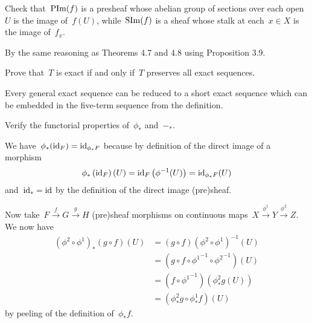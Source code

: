 \documentclass[a4paper,11pt,oneside,openany,article]{memoir}
\begin{document}
\begin{exercise}[6.3]
  Check that~$\operatorname{PIm}(f)$ is a presheaf whose abelian group of sections over each open~$U$ is the image of~$f(U)$, while~$\operatorname{SIm}(f)$ is a sheaf whose stalk at each~$x\in X$ is the image of~$f_x$.

  \begin{solution}
    By the same reasoning as Theorems 4.7 and 4.8 using Proposition 3.9.
  \end{solution}
\end{exercise}

\begin{exercise}[6.8]
  Prove that~$T$ is exact if and only if~$T$ preserves all exact sequences.

  \begin{solution}
    Every general exact sequence can be reduced to a short exact sequence which can be embedded in the five-term sequence from the definition.
  \end{solution}
\end{exercise}

\begin{exercise}[7.4]
  Verify the functorial properties of~$\phi_\ast$ and~$-_\ast$.

  \begin{solution}
    We have~$\phi_\ast(\operatorname{id}_F)=\operatorname{id}_{\phi_\ast F}$ because by definition of the direct image of a morphism
    \begin{equation}
      \phi_\ast\left( \operatorname{id}_F \right)(U) =\operatorname{id}_F\left( \phi^{-1}(U) \right)=\operatorname{id}_{\phi_\ast F}(U)
    \end{equation}
    and~$\operatorname{id}_\ast=\operatorname{id}$ by the definition of the direct image (pre)sheaf.

    Now take~$F\overset{f}{\to}G\overset{g}{\to}H$ (pre)sheaf morphisms on continuous maps~$X\overset{\phi^1}{\to}Y\overset{\phi^2}{\to}Z$. We now have
    \begin{align}
      \left( \phi^2\circ\phi^1 \right)_\ast\left( g\circ f \right)(U)&=\left( g\circ f \right)\left( \phi^2\circ\phi^1 \right)^{-1}(U) \\
      &=\left( g\circ f\circ{\phi^1}^{-1}\circ{\phi^2}^{-1} \right)(U) \\
      &=\left( f\circ{\phi^1}^{-1} \right)\left( \phi^2_\ast g(U) \right) \\
      &=\left( \phi_\ast^2g\circ\phi^1_\ast f \right)(U)
    \end{align}
    by peeling of the definition of~$\phi_\ast f$.
  \end{solution}
\end{exercise}
\end{document}
